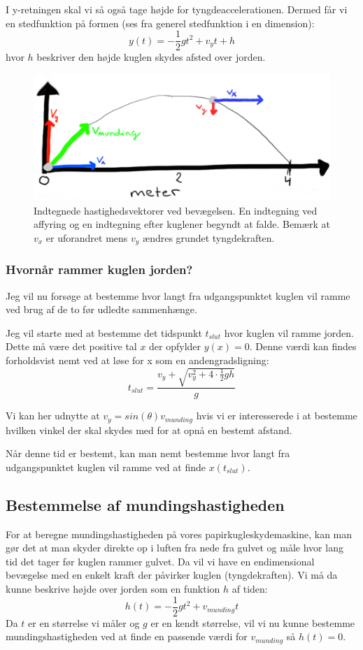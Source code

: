 \documentclass[12pt,a4paper]{article}
\theoremstyle{break}
\theoremstyle{nonumberplain}
\begin{document}
I y-retningen skal vi så også tage højde for tyngdeaccelerationen.
Dermed får vi en stedfunktion på formen (ses fra generel stedfunktion i en dimension): $$y(t)=-\frac{1}{2}gt^2+v_yt+h$$
hvor $h$ beskriver den højde kuglen skydes afsted over jorden.
\begin{figure}
\center
\includegraphics[scale=0.4]{diagram}
\caption{Indtegnede hastighedsvektorer ved bevægelsen. En indtegning ved affyring og en indtegning efter kuglener begyndt at falde. Bemærk at $v_x$ er uforandret mens $v_y$ ændres grundet tyngdekraften.}
\end{figure}

\subsubsection{Hvornår rammer kuglen jorden?}
Jeg vil nu forsøge at bestemme hvor langt fra udgangspunktet kuglen vil ramme ved brug af de to før udledte sammenhænge.

Jeg vil starte med at bestemme det tidspunkt $t_{slut}$ hvor kuglen vil ramme jorden.
Dette må være det positive tal $x$ der opfylder $y(x)=0$. 
Denne værdi kan findes forholdsvist nemt ved at løse for x som en andengradsligning:
$$t_{slut} = \dfrac{v_y + \sqrt{v_y^2 + 4 \cdot \frac{1}{2}gh}}{g}$$

Vi kan her udnytte at $v_y = sin(\theta )v_{munding}$ hvis vi er interesserede i at bestemme hvilken vinkel der skal skydes med for at opnå en bestemt afstand.

Når denne tid er bestemt, kan man nemt bestemme hvor langt fra udgangspunktet kuglen vil ramme ved at finde $x(t_{slut})$.

\subsection{Bestemmelse af mundingshastigheden}
For at beregne mundingshastigheden på vores papirkugleskydemaskine, kan man gør det at man skyder direkte op i luften fra nede fra gulvet og måle hvor lang tid det tager før kuglen rammer gulvet.
Da vil vi have en endimensional bevægelse med en enkelt kraft der påvirker kuglen (tyngdekraften). 
Vi må da kunne beskrive højde over jorden som en funktion $h$ af tiden:
$$h(t)=-\frac{1}{2}gt^2 + v_{munding}t$$
Da $t$ er en størrelse vi måler og $g$ er en kendt størrelse, vil vi nu kunne bestemme mundingshastigheden ved at finde en passende værdi for $v_{munding}$ så $h(t)=0$.
\pagebreak
\end{document}
